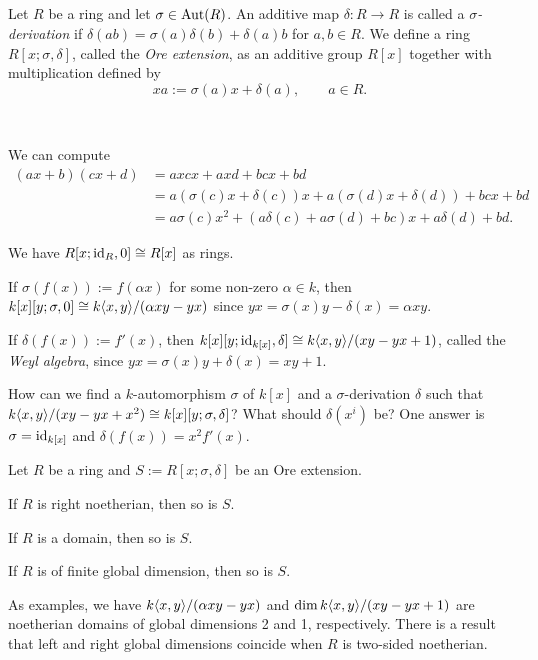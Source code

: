 \documentclass{../../../small}
\begin{document}
\subsection{}
Let $R$ be a ring and let $\sigma\in\operatorname{Aut}(R)$.
An additive map $\delta:R\to R$ is called a \emph{$\sigma$-derivation} if $\delta(ab)=\sigma(a)\delta(b)+\delta(a)b$ for $a,b\in R$.
We define a ring $R[x;\sigma,\delta]$, called the \emph{Ore extension}, as an additive group $R[x]$ together with multiplication defined by
\[xa:=\sigma(a)x+\delta(a),\qquad a\in R.\]
\begin{ex}\,
\begin{parts}
\item We can compute
\begin{align*}
(ax+b)(cx+d)
&=axcx+axd+bcx+bd\\
&=a(\sigma(c)x+\delta(c))x+a(\sigma(d)x+\delta(d))+bcx+bd\\
&=a\sigma(c)x^2+(a\delta(c)+a\sigma(d)+bc)x+a\delta(d)+bd.
\end{align*}
\item We have $R[x;\operatorname{id}_R,0]\cong R[x]$ as rings.
\item If $\sigma(f(x)):=f(\alpha x)$ for some non-zero $\alpha\in k$, then $k[x][y;\sigma,0]\cong k\langle x,y\rangle/(\alpha xy-yx)$ since $yx=\sigma(x)y-\delta(x)=\alpha xy$.
\item If $\delta(f(x)):=f'(x)$, then $k[x][y;\operatorname{id}_{k[x]},\delta]\cong k\langle x,y\rangle/(xy-yx+1)$, called the \emph{Weyl algebra}, since $yx=\sigma(x)y+\delta(x)=xy+1$.
\item How can we find a $k$-automorphism $\sigma$ of $k[x]$ and a $\sigma$-derivation $\delta$ such that $k\langle x,y\rangle/(xy-yx+x^2)\cong k[x][y;\sigma,\delta]$? What should $\delta(x^i)$ be? One answer is $\sigma=\operatorname{id}_{k[x]}$ and $\delta(f(x))=x^2f'(x)$.
\end{parts}
\end{ex}
\begin{thm}
Let $R$ be a ring and $S:=R[x;\sigma,\delta]$ be an Ore extension.
\begin{parts}
\item If $R$ is right noetherian, then so is $S$.
\item If $R$ is a domain, then so is $S$.
\item If $R$ is of finite global dimension, then so is $S$.
\end{parts}
\end{thm}
As examples, we have $k\langle x,y\rangle/(\alpha xy-yx)$ and $\dim k\langle x,y\rangle/(xy-yx+1)$ are noetherian domains of global dimensions 2 and 1, respectively.
There is a result that left and right global dimensions coincide when $R$ is two-sided noetherian.
\end{document}

